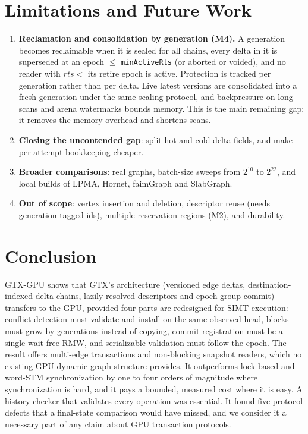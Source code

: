 \documentclass[sigconf,nonacm]{acmart}
\newcommand{\sys}{GTX-GPU}
\newcommand{\code}[1]{\texttt{#1}}
\begin{document}
\section{Limitations and Future Work}
\label{sec:limits}
\begin{enumerate}
\item \textbf{Reclamation and consolidation by generation (M4).} A generation becomes reclaimable when it is sealed for
all chains, every delta in it is superseded at an epoch $\le$ \code{minActiveRts} (or aborted or voided), and no
reader with $rts <$ its retire epoch is active. Protection is tracked per generation rather than per delta. Live
latest versions are consolidated into a fresh generation under the same sealing protocol, and backpressure on long
scans and arena watermarks bounds memory. This is the main remaining gap: it removes the memory overhead and
shortens scans.
\item \textbf{Closing the uncontended gap}: split hot and cold delta fields, and make per-attempt bookkeeping cheaper.
\item \textbf{Broader comparisons}: real graphs, batch-size sweeps from $2^{10}$ to $2^{22}$, and local builds of LPMA,
Hornet, faimGraph and SlabGraph.
\item \textbf{Out of scope}: vertex insertion and deletion, descriptor reuse (needs generation-tagged ids), multiple
reservation regions (M2), and durability.
\end{enumerate}

\section{Conclusion}
\sys{} shows that GTX's architecture (versioned edge deltas, destination-indexed delta chains, lazily resolved
descriptors and epoch group commit) transfers to the GPU, provided four parts are redesigned for SIMT execution:
conflict detection must validate and install on the same observed head, blocks must grow by generations instead of
copying, commit registration must be a single wait-free RMW, and serializable validation must follow the epoch. The
result offers multi-edge transactions and non-blocking snapshot readers, which no existing GPU dynamic-graph structure
provides. It outperforms lock-based and word-STM synchronization by one to four orders of magnitude where
synchronization is hard, and it pays a bounded, measured cost where it is easy. A history checker that validates every
operation was essential. It found five protocol defects that a final-state comparison would have missed, and we
consider it a necessary part of any claim about GPU transaction protocols.
\end{document}
